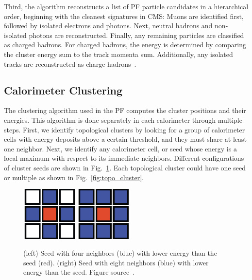 Third, the algorithm reconstructs a list of PF particle candidates in a hierarchical order, beginning with the cleanest signatures in CMS: Muons are identified first, followed by isolated electrons and photons. Next, neutral hadrons and non-isolated photons are reconstructed.
Finally, any remaining particles are classified as charged hadrons.
For charged hadrons, the energy is determined by comparing the cluster energy sum to the track momenta sum.
Additionally, any isolated tracks are reconstructed as charge hadrons~\cite{PF_workshop}.

\subsection{Calorimeter Clustering}
\label{subsec:clustering}
The clustering algorithm used in the PF computes the cluster positions and their energies.
This algorithm is done separately in each calorimeter through multiple steps.
First, we identify topological clusters by looking for a group of calorimeter cells with energy deposits above a certain threshold, and they must share at least one neighbor.
Next, we identify any calorimeter cell, or seed whose energy is a local maximum with respect to its immediate neighbors.
Different configurations of cluster seeds are shown in Fig.~\ref{fig:seeds}.
Each topological cluster could have one seed or multiple as shown in Fig.~\ref{fig:topo_cluster}.

\begin{figure}[t!]
\centering
\includegraphics[width=0.25\textwidth]{figures/seed_4neighbours.png}
\includegraphics[width=0.25\textwidth]{figures/seed_8neighbours.png}
\caption[Types of cluster seed]
        {(left) Seed with four neighbors (blue) with lower energy than the seed (red).
          (right) Seed with eight neighbors (blue) with lower energy than the seed.
          Figure source~\cite{Clustering}.}
\label{fig:seeds}
\end{figure}

